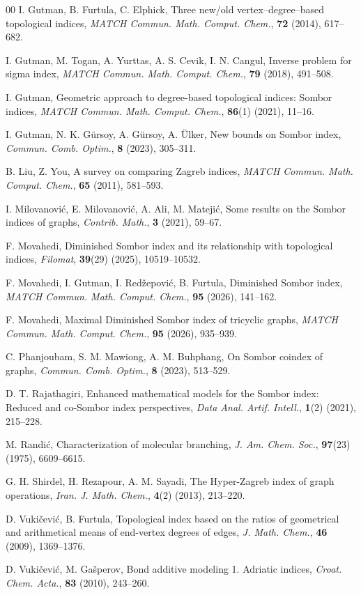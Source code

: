 \documentclass{article}
\theoremstyle{definition}
\begin{document}
\begin{thebibliography}{00}
I. Gutman, B. Furtula, C. Elphick, Three new/old vertex–degree–based topological indices, \textit{MATCH Commun. Math. Comput. Chem.}, \textbf{72} (2014), 617–682.

I. Gutman, M. Togan, A. Yurttas, A. S. Cevik, I. N. Cangul, Inverse problem for sigma index, \textit{MATCH Commun. Math. Comput. Chem.}, \textbf{79} (2018), 491–508.


I. Gutman, Geometric approach to degree-based topological indices: Sombor indices, \textit{MATCH Commun. Math. Comput. Chem.}, \textbf{86}(1) (2021), 11–16.

I. Gutman, N. K. Gürsoy, A. Gürsoy, A. Ülker, New bounds on Sombor index, \textit{Commun. Comb. Optim.}, \textbf{8} (2023), 305–311.

B. Liu, Z. You, A survey on comparing Zagreb indices, \textit{MATCH Commun. Math. Comput. Chem.}, \textbf{65} (2011), 581–593.

I. Milovanović, E. Milovanović, A. Ali, M. Matejić, Some results on the Sombor indices of graphs, \textit{Contrib. Math.}, \textbf{3} (2021), 59–67.

F. Movahedi, Diminished Sombor index and its relationship with topological indices, \textit{Filomat}, \textbf{39}(29) (2025), 10519–10532.

F. Movahedi, I. Gutman, I. Redžepović, B. Furtula, Diminished Sombor index, \textit{MATCH Commun. Math. Comput. Chem.}, \textbf{95} (2026), 141–162.

F. Movahedi, Maximal Diminished Sombor index of tricyclic graphs, \textit{MATCH Commun. Math. Comput. Chem.}, \textbf{95} (2026), 935--939.

C. Phanjoubam, S. M. Mawiong, A. M. Buhphang, On Sombor coindex of graphs, \textit{Commun. Comb. Optim.}, \textbf{8} (2023), 513–529.

D. T. Rajathagiri, Enhanced mathematical models for the Sombor index: Reduced and co-Sombor index perspectives, \textit{Data Anal. Artif. Intell.}, \textbf{1}(2) (2021), 215–228.

M. Randić, Characterization of molecular branching, \textit{J. Am. Chem. Soc.}, \textbf{97}(23) (1975), 6609–6615.

G. H. Shirdel, H. Rezapour, A. M. Sayadi, The Hyper-Zagreb index of graph operations, \textit{Iran. J. Math. Chem.}, \textbf{4}(2) (2013), 213–220.

D. Vukičević, B. Furtula, Topological index based on the ratios of geometrical and arithmetical means of end-vertex degrees of edges, \textit{J. Math. Chem.}, \textbf{46} (2009), 1369–1376.

D. Vukičević, M. Gašperov, Bond additive modeling 1. Adriatic indices, \textit{Croat. Chem. Acta.}, \textbf{83} (2010), 243–260.


\end{thebibliography}
\end{document}
